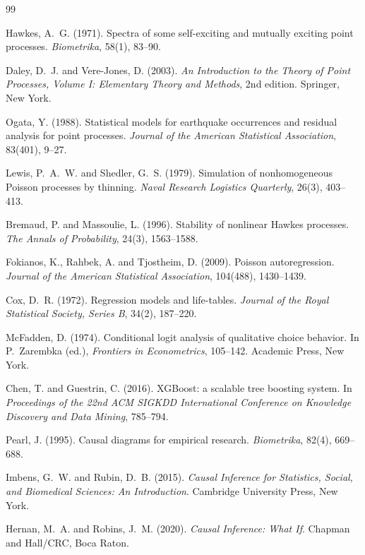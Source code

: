 \begin{thebibliography}{99}

 Hawkes, A.~G. (1971). Spectra of some self-exciting and mutually exciting point
processes. \emph{Biometrika}, 58(1), 83--90.

 Daley, D.~J. and Vere-Jones, D. (2003). \emph{An Introduction to the Theory of Point
Processes, Volume I: Elementary Theory and Methods}, 2nd edition. Springer, New York.

 Ogata, Y. (1988). Statistical models for earthquake occurrences and residual analysis
for point processes. \emph{Journal of the American Statistical Association}, 83(401), 9--27.

 Lewis, P.~A.~W. and Shedler, G.~S. (1979). Simulation of nonhomogeneous Poisson
processes by thinning. \emph{Naval Research Logistics Quarterly}, 26(3), 403--413.

 Bremaud, P. and Massoulie, L. (1996). Stability of nonlinear Hawkes processes.
\emph{The Annals of Probability}, 24(3), 1563--1588.

 Fokianos, K., Rahbek, A. and Tjostheim, D. (2009). Poisson autoregression.
\emph{Journal of the American Statistical Association}, 104(488), 1430--1439.

 Cox, D.~R. (1972). Regression models and life-tables. \emph{Journal of the Royal
Statistical Society, Series B}, 34(2), 187--220.

 McFadden, D. (1974). Conditional logit analysis of qualitative choice behavior. In
P.~Zarembka (ed.), \emph{Frontiers in Econometrics}, 105--142. Academic Press, New York.

 Chen, T. and Guestrin, C. (2016). XGBoost: a scalable tree boosting system. In
\emph{Proceedings of the 22nd ACM SIGKDD International Conference on Knowledge Discovery and Data Mining},
785--794.

 Pearl, J. (1995). Causal diagrams for empirical research. \emph{Biometrika}, 82(4),
669--688.

 Imbens, G.~W. and Rubin, D.~B. (2015). \emph{Causal Inference for Statistics, Social,
and Biomedical Sciences: An Introduction}. Cambridge University Press, New York.

 Hernan, M.~A. and Robins, J.~M. (2020). \emph{Causal Inference: What If}. Chapman and
Hall/CRC, Boca Raton.


\end{thebibliography}
